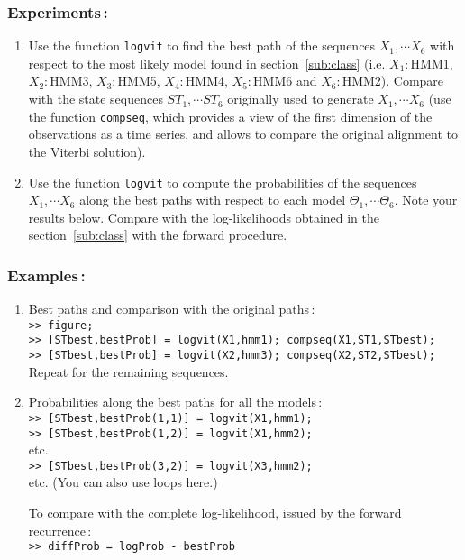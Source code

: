 \documentclass[twoside,a4paper,titlepage]{article}
\newcommand{\mat}[1]{{\tt >> #1} \\}
\newcommand{\com}[1]{{\tt #1}}
\begin{document}
\subsubsection*{Experiments\,:}
\begin{enumerate}
\item Use the function \com{logvit} to find the best path of the sequences
$X_1, \cdots X_6$ with respect to the most likely model found in
section~\ref{sub:class} (i.e. $X_1$:\,HMM1, $X_2$:\,HMM3, $X_3$:\,HMM5,
$X_4$:\,HMM4, $X_5$:\,HMM6 and $X_6$:\,HMM2). Compare with the state
sequences $ST_1, \cdots ST_6$ originally used to generate $X_1, \cdots X_6$
(use the function \com{compseq}, which provides a view of the first
dimension of the observations as a time series, and allows to compare the
original alignment to the Viterbi solution).
%
\item Use the function \com{logvit} to compute the probabilities of the
sequences $X_1, \cdots X_6$ along the best paths with respect to each model
$\Theta_1, \cdots \Theta_6$. Note your results below. Compare with the
log-likelihoods obtained in the section~\ref{sub:class} with the forward
procedure.
\end{enumerate}

\subsubsection*{Examples\,:}
\begin{enumerate}
\item Best paths and comparison with the original paths\,: \\
\mat{figure;}
\mat{[STbest,bestProb] = logvit(X1,hmm1); compseq(X1,ST1,STbest);}
\mat{[STbest,bestProb] = logvit(X2,hmm3); compseq(X2,ST2,STbest);}
Repeat for the remaining sequences.
%
\item Probabilities along the best paths for all the models\,: \\
\mat{[STbest,bestProb(1,1)] = logvit(X1,hmm1);}
\mat{[STbest,bestProb(1,2)] = logvit(X1,hmm2);}
etc. \\
\mat{[STbest,bestProb(3,2)] = logvit(X3,hmm2);}
%
etc. (You can also use loops here.)

To compare with the complete log-likelihood, issued by the forward
recurrence\,: \\
%
\mat{diffProb = logProb - bestProb}
\end{enumerate}
\end{document}
